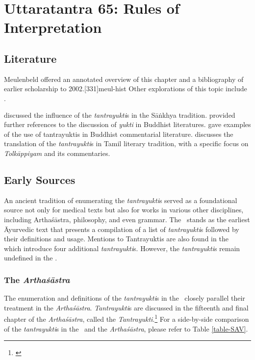 
\chapter[Uttaratantra 65:  Rules of Interpretation]{Uttaratantra 65:  
Rules of Interpretation}

\section{Literature} 

Meulenbeld offered an annotated overview of this chapter and a bibliography
of earlier scholarship to 2002.[331]{meul-hist}  Other explorations 
of this topic include \cite{dasg-1952,
lele-1981,
mejo-2000,
nara-1949,
ober-1968,
scha-1993,
sing-2003,
muth-1976}. 


\cite{frau-1958} discussed the influence of the \emph{tantrayukti}s in the Sāṅkhya tradition.
\citet[105--106, fn.\,109]{prei-2013} provided further references to the
discussion of \emph{yukti} in Buddhist literatures. \citet{mane-2008}
gave examples of the use of tantrayuktis in Buddhist commentarial
literature. \citet{chev-2009} discusses the translation of the \emph{tantrayukti}s in Tamil literary tradition, with a specific focus on \emph{Tolkāppiyam} and its commentaries.


\section{Early Sources}

An ancient tradition of enumerating the \emph{tantrayukti}s served as a 
foundational source not only for medical texts but also for works in various other 
disciplines, including Arthaśāstra, philosophy, and even grammar. The \SS\  stands 
as the earliest Āyurvedic text that presents a compilation of a list of 
\emph{tantrayukti}s followed by their definitions and usage. Mentions to 
Tantrayuktis are also found in the \CS\   which introduce four additional 
\emph{tantrayukti}s. However, the \emph{tantrayukti}s remain undefined in the 
\CS. 

\subsection{The \emph{Arthaśāstra}} 
The enumeration and definitions of the \emph{tantrayukti}s in the 
\SS\  closely parallel their treatment in the \emph{Arthaśāstra}. 
\emph{Tantrayukti}s are discussed in the fifteenth and final chapter of the 
\emph{Arthaśāstra}, called the 
\emph{Tantrayukti}.\footnote{\cite[280--283]{kang-1960}} For a side-by-side 
comparison of the \emph{tantrayukti}s in the \SS\ and the \emph{Arthaśāstra}, 
please refer to Table \ref{table-SAV}.

